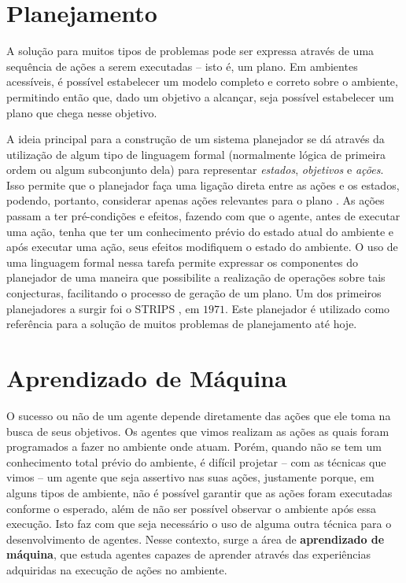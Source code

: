 \section{Planejamento}
A solução para muitos tipos de problemas pode ser expressa através de uma
sequência de ações a serem executadas -- isto é, um plano. Em ambientes
acessíveis, é possível estabelecer um modelo completo e correto sobre o
ambiente, permitindo então que, dado um objetivo a alcançar, seja possível
estabelecer um plano que chega nesse objetivo.

A ideia principal para a construção de um sistema planejador se dá através da
utilização de algum tipo de linguagem formal (normalmente lógica de primeira
ordem ou algum subconjunto dela) para representar \textit{estados},
\textit{objetivos} e \textit{ações}. Isso permite que o planejador faça uma
ligação direta entre as ações e os estados, podendo, portanto, considerar
apenas ações relevantes para o plano \cite{Russell:1995:AIM:193191}. As ações
passam a ter pré-condições e efeitos, fazendo com que o agente, antes de
executar uma ação, tenha que ter um conhecimento prévio do estado atual do
ambiente e após executar uma ação, seus efeitos modifiquem o estado do
ambiente. O uso de uma linguagem formal nessa tarefa permite expressar os
componentes do planejador de uma maneira que possibilite a realização de
operações sobre tais conjecturas, facilitando o processo de geração de um
plano. Um dos primeiros planejadores a surgir foi o STRIPS
\cite{Fikes:1971:SNA:1622876.1622939}, em $1971$. Este planejador é utilizado
como referência para a solução de muitos problemas de planejamento até hoje.


\section{Aprendizado de Máquina}
O sucesso ou não de um agente depende diretamente das ações que ele toma na
busca de seus objetivos. Os agentes que vimos realizam as ações as quais foram
programados a fazer no ambiente onde atuam. Porém, quando não se tem um
conhecimento total prévio do ambiente, é difícil projetar -- com as técnicas
que vimos -- um agente que seja assertivo nas suas ações, justamente porque, em
alguns tipos de ambiente, não é possível garantir que as ações foram executadas
conforme o esperado, além de não ser possível observar o ambiente após essa
execução. Isto faz com que seja necessário o uso de alguma outra técnica para o
desenvolvimento de agentes. Nesse contexto, surge a área de \textbf{aprendizado
de máquina}, que estuda agentes capazes de aprender através das experiências
adquiridas na execução de ações no ambiente.


